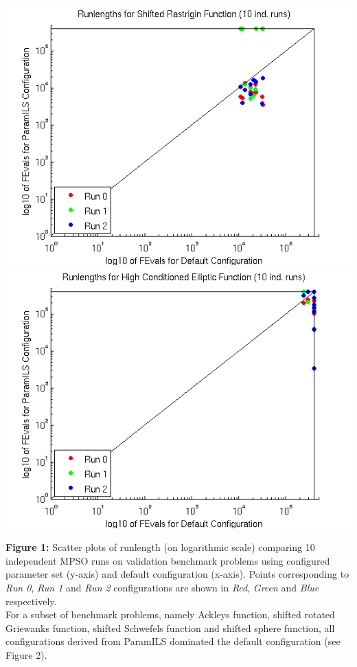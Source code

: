 \begin{center}
\hfill \includegraphics[scale=0.45]{scatterRastrigin.png} \quad \includegraphics[scale=0.45]{scatterElliptic.png} \hfill
\end{center}
\textbf{Figure 1:} Scatter plots of runlength (on logarithmic scale) comparing 10 independent MPSO runs on validation benchmark problems using configured parameter set (y-axis) and default configuration (x-axis). Points corresponding to {\it Run 0}, {\it Run 1} and {\it Run 2} configurations are shown in {\it Red}, {\it Green} and {\it Blue} respectively.\\

For a subset of benchmark problems, namely Ackley{\vtick}s function, shifted rotated Griewank{\vtick}s function, shifted Schwefel{\vtick}s function and shifted sphere function, all configurations derived from ParamILS dominated the default configuration (see Figure 2).\\

